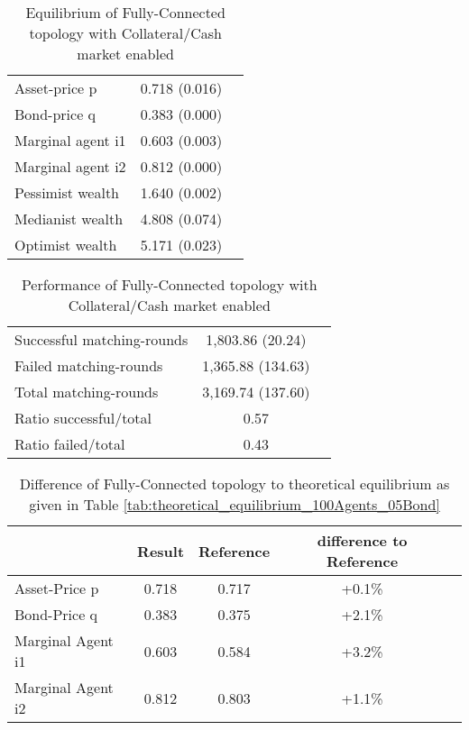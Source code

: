 \documentclass[Bachelorarbeit.tex]{subfiles}
\begin{document}
\begin{table}[H]
	\caption{Equilibrium of Fully-Connected topology with Collateral/Cash market enabled}
	\label{tab:equilibrium_FULLY_CONNECTED_WITH_COLLATERALCASH}
	\centering
	\begin{tabular} { l c r }
		\hline
		Asset-price p & 0.718 (0.016) \\
		Bond-price q & 0.383 (0.000) \\
		Marginal agent i1 & 0.603 (0.003) \\
		Marginal agent i2 & 0.812 (0.000) \\
		\hline
		Pessimist wealth & 1.640 (0.002) \\
		Medianist wealth & 4.808 (0.074) \\
		Optimist wealth & 5.171 (0.023) \\
		\hline
	\end{tabular}
\end{table} 

\begin{table}[H]
	\caption{Performance of Fully-Connected topology with Collateral/Cash market enabled}
	\centering
	\begin{tabular} { l c r }
		\hline
		Successful matching-rounds & 1,803.86 (20.24) \\
		Failed matching-rounds & 1,365.88 (134.63) \\
		Total matching-rounds & 3,169.74 (137.60) \\
		\hline
		Ratio successful/total & 0.57 \\
		Ratio failed/total & 0.43 \\
		\hline
	\end{tabular}
\end{table}

\begin{table}[H]
	\caption{Difference of Fully-Connected topology to theoretical equilibrium as given in Table \ref{tab:theoretical_equilibrium_100Agents_05Bond}}
	\centering
	\begin{tabular} { l c c c r }
		& Result & Reference & difference to Reference \\
		\hline
		Asset-Price p & 0.718 & 0.717 & +0.1\% \\
		Bond-Price q & 0.383 & 0.375 & +2.1\% \\
		Marginal Agent i1 & 0.603 & 0.584 & +3.2\% \\
		Marginal Agent i2 & 0.812 & 0.803 & +1.1\% \\
		\hline
	\end{tabular}
\end{table} 
\end{document}
